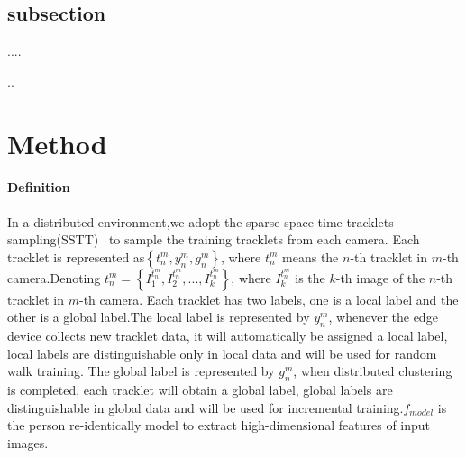 \documentclass{article}
\begin{document}
\subsection{subsection}
....

..

\section{Method}
\paragraph{Definition} 
In a distributed environment,we adopt the sparse space-time tracklets sampling(SSTT)~\cite{li2018unsupervised} to sample the training tracklets from each camera. Each tracklet is represented as$\left \{t_{n}^{m}, y_{n}^{m}, g_{n}^{m}\right \}$, where $t_{n}^{m}$ means the $n$-th tracklet in $m$-th camera.Denoting $t_{n}^{m}=\left \{  I_{1}^{t_{n}^{m}},  I_{2}^{t_{n}^{m}},...,I_{k}^{t_{n}^{m}} \right \}$, where $I_{k}^{t_{n}^{m}}$ is the $k$-th image of the $n$-th tracklet in $m$-th camera. Each tracklet has two labels, one is a local label and the other is a global label.The local label is represented by $y_{n}^{m}$, whenever the edge device collects new tracklet data, it will automatically be assigned a local label, local labels are distinguishable only in local data and will be used for random walk training. The global label is represented by $g_{n}^{m}$, when distributed clustering is completed, each tracklet will obtain a global label, global labels are distinguishable in global data and will be used for incremental training.$f_{model}$ is the person re-identically model to extract high-dimensional features of input images.
\end{document}
